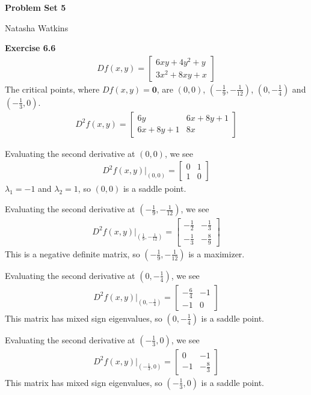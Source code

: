 \documentclass[letterpaper,12pt]{article}
\newcommand{\vect}[1]{\mathbf{#1}}
\begin{document}
\textbf{\large Problem Set 5}

Natasha Watkins

\vspace{5mm}

\textbf{Exercise 6.6}
\begin{align*}
Df(x, y) =
\begin{bmatrix}
6xy + 4y^2 + y \\
3x^2 +8xy + x
\end{bmatrix}
\end{align*}
The critical points, where $Df(x, y) = \vect{0}$, are $(0, 0)$,  $(-\frac{1}{9}, -\frac{1}{12})$, $(0, -\frac{1}{4})$ and $(-\frac{1}{3}, 0)$.
\begin{align*}
D^2f(x, y) =
\begin{bmatrix}
6y & 6x + 8y + 1 \\
6x + 8y + 1 & 8x
\end{bmatrix}
\end{align*}

Evaluating the second derivative at $(0, 0)$, we see
\begin{align*}
D^2f(x, y)\big|_{(0, 0)} =
\begin{bmatrix}
0 & 1 \\
1 & 0
\end{bmatrix}
\end{align*}
$\lambda_1 = -1$ and $\lambda_2 = 1$, so $(0, 0)$ is a saddle point.

Evaluating the second derivative at $(-\frac{1}{9}, -\frac{1}{12})$, we see
\begin{align*}
D^2f(x, y)\big|_{(\frac{1}{9}, -\frac{1}{12})} =
\begin{bmatrix}
-\frac{1}{2} & -\frac{1}{3} \\
-\frac{1}{3} & -\frac{8}{9}
\end{bmatrix}
\end{align*}
This is a negative definite matrix, so $(-\frac{1}{9}, -\frac{1}{12})$ is a maximizer.

Evaluating the second derivative at $(0, -\frac{1}{4})$, we see
\begin{align*}
D^2f(x, y)\big|_{(0, -\frac{1}{4})} =
\begin{bmatrix}
-\frac{6}{4} & -1 \\
-1 & 0
\end{bmatrix}
\end{align*}
This matrix has mixed sign eigenvalues, so $(0, -\frac{1}{4})$ is a saddle point.

Evaluating the second derivative at $(-\frac{1}{3}, 0)$, we see
\begin{align*}
D^2f(x, y)\big|_{(-\frac{1}{3}, 0)} =
\begin{bmatrix}
0 & -1 \\
-1 & -\frac{8}{3}
\end{bmatrix}
\end{align*}
This matrix has mixed sign eigenvalues, so $(-\frac{1}{3}, 0)$ is a saddle point.
\end{document}
